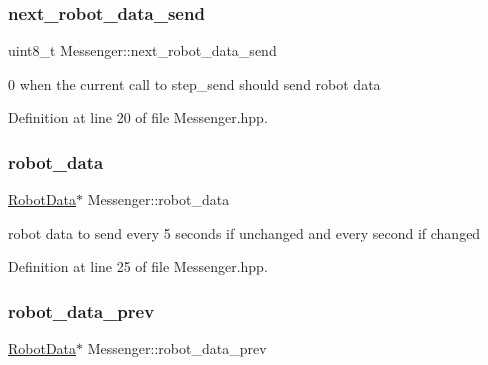 \mbox{\label{class_messenger_af47b5f9743fcef4fdb73801ae7c6b023}} 
\subsubsection{\texorpdfstring{next\+\_\+robot\+\_\+data\+\_\+send}{next\_robot\_data\_send}}
{\footnotesize\ttfamily uint8\+\_\+t Messenger\+::next\+\_\+robot\+\_\+data\+\_\+send\hspace{0.3cm}{\ttfamily [private]}}



0 when the current call to step\+\_\+send should send robot data 



Definition at line 20 of file Messenger.\+hpp.

\mbox{\label{class_messenger_aaeacb9e9c4aad3b1be628df9ec71c11c}} 
\subsubsection{\texorpdfstring{robot\+\_\+data}{robot\_data}}
{\footnotesize\ttfamily \hyperlink{class_robot_data}{Robot\+Data}$\ast$ Messenger\+::robot\+\_\+data\hspace{0.3cm}{\ttfamily [private]}}



robot data to send every 5 seconds if unchanged and every second if changed 



Definition at line 25 of file Messenger.\+hpp.

\mbox{\label{class_messenger_a65277b6683e6c95e15fcf0eddad6df45}} 
\subsubsection{\texorpdfstring{robot\+\_\+data\+\_\+prev}{robot\_data\_prev}}
{\footnotesize\ttfamily \hyperlink{class_robot_data}{Robot\+Data}$\ast$ Messenger\+::robot\+\_\+data\+\_\+prev\hspace{0.3cm}{\ttfamily [private]}}



